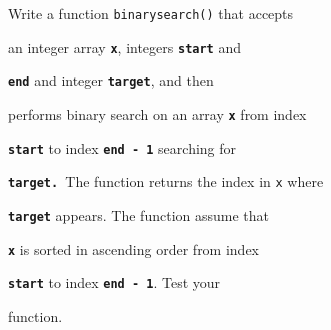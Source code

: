 Write a function \texttt{binarysearch()} that accepts

an integer array \texttt{\textbf{x}}, integers \texttt{\textbf{start}} and

\texttt{\textbf{end}} and integer \texttt{\textbf{target}}, and then

performs binary search on an array \texttt{\textbf{x}} from index

\texttt{\textbf{start}} to index \texttt{\textbf{end - 1}} searching for

\texttt{\textbf{target. }}The function returns the index in \texttt{x} where

\texttt{\textbf{target}} appears. The function assume that

\texttt{\textbf{x}} is sorted in ascending order from index

\texttt{\textbf{start}} to index \texttt{\textbf{end - 1}}. Test your

function.

